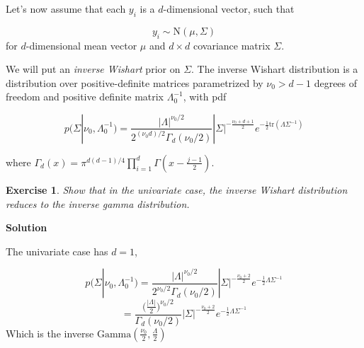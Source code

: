 \documentclass[twoside]{article}
\newcounter{lecnum}
\newtheorem{exercise}{Exercise}[lecnum]
\begin{document}
Let's now assume that each $y_i$ is a $d$-dimensional vector, such that

$$y_i \sim \mbox{N}(\mu, \Sigma)$$
for $d$-dimensional mean vector $\mu$ and $d\times d$ covariance matrix $\Sigma$.

We will put an \textit{inverse Wishart} prior on $\Sigma$. The inverse Wishart distribution is a distribution over positive-definite matrices parametrized by $\nu_0>d-1$ degrees of freedom and  positive definite matrix $\Lambda_0^{-1}$, with pdf

$$p(\Sigma|\nu_0, \Lambda_0^{-1}) = \frac{|\Lambda|^{\nu_0/2}}{2^{(\nu_0 d)/2}\Gamma_d(\nu_0/2)}|\Sigma|^{-\frac{\nu_0+d+1}{2}}e^{-\frac{1}{2}\mbox{tr}(\Lambda\Sigma^{-1})}$$

where
$\Gamma_d(x) = \pi^{d(d-1)/4}\prod_{i=1}^d\Gamma\left(x-\frac{j-1}{2}\right)$.
\begin{exercise}
  Show that in the univariate case, the inverse Wishart distribution reduces to the inverse gamma distribution.
\end{exercise}

\color{blue}
\textbf{Solution}

The univariate case has $d=1$,

$$p(\Sigma|\nu_0, \Lambda_0^{-1}) = \frac{|\Lambda|^{\nu_0/2}}{2^{\nu_0 /2}\Gamma_d(\nu_0/2)}|\Sigma|^{-\frac{\nu_0+2}{2}}e^{-\frac{1}{2}\Lambda\Sigma^{-1}}$$
$$ =
 \frac{\big(\frac{|\Lambda|}{2}\big)^{\nu_0/2}}{\Gamma_d(\nu_0/2)}|\Sigma|^{-\frac{\nu_0+2}{2}}e^{-\frac{1}{2}\Lambda\Sigma^{-1}}
$$
Which is the inverse $\mbox{Gamma}(\frac{\nu_0}{2},\frac{\Lambda}{2})$

\color{black}
\end{document}
